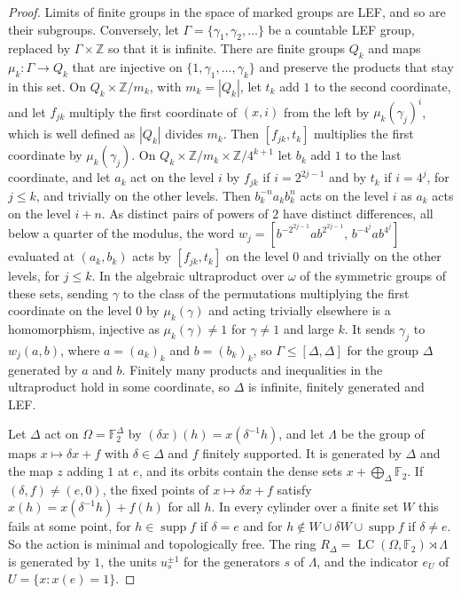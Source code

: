 \documentclass[11pt]{amsart}
\newcommand{\F}{\mathbb F}
\newcommand{\Z}{\mathbb Z}
\newcommand{\LC}{\operatorname{LC}}
\begin{document}
\begin{proof}
Limits of finite groups in the space of marked groups are LEF, and so are
their subgroups. Conversely, let $\Gamma=\{\gamma_1,\gamma_2,\dots\}$ be a
countable LEF group, replaced by $\Gamma\times\Z$ so that it is infinite.
There are finite groups $Q_k$ and maps $\mu_k\colon\Gamma\to Q_k$ that are
injective on $\{1,\gamma_1,\dots,\gamma_k\}$ and preserve the products
that stay in this set. On $Q_k\times\Z/m_k$, with $m_k=|Q_k|$, let $t_k$
add $1$ to the second coordinate, and let $f_{jk}$ multiply the first
coordinate of $(x,i)$ from the left by $\mu_k(\gamma_j)^i$, which is well
defined as $|Q_k|$ divides $m_k$. Then $[f_{jk},t_k]$ multiplies the first
coordinate by $\mu_k(\gamma_j)$. On $Q_k\times\Z/m_k\times\Z/4^{k+1}$ let
$b_k$ add $1$ to the last coordinate, and let $a_k$ act on the level $i$
by $f_{jk}$ if $i=2^{2j-1}$ and by $t_k$ if $i=4^j$, for $j\le k$, and
trivially on the other levels. Then $b_k^{-n}a_kb_k^n$ acts on the level
$i$ as $a_k$ acts on the level $i+n$. As distinct pairs of powers of $2$
have distinct differences, all below a quarter of the modulus, the word
$w_j=[b^{-2^{2j-1}}ab^{2^{2j-1}},\,b^{-4^j}ab^{4^j}]$ evaluated at
$(a_k,b_k)$ acts by $[f_{jk},t_k]$ on the level $0$ and trivially on the
other levels, for $j\le k$. In the algebraic ultraproduct over $\omega$ of
the symmetric groups of these sets, sending $\gamma$ to the class of the
permutations multiplying the first coordinate on the level $0$ by
$\mu_k(\gamma)$ and acting trivially elsewhere is a homomorphism,
injective as $\mu_k(\gamma)\ne1$ for $\gamma\ne1$ and large $k$. It sends
$\gamma_j$ to $w_j(a,b)$, where $a=(a_k)_k$ and $b=(b_k)_k$, so
$\Gamma\le[\Delta,\Delta]$ for the group $\Delta$ generated by $a$ and $b$.
Finitely many products and inequalities in the ultraproduct hold in some
coordinate, so $\Delta$ is infinite, finitely generated and LEF.

Let $\Delta$ act on $\Omega=\F_2^{\Delta}$ by $(\delta x)(h)=x(\delta^{-1}h)$,
and let $\Lambda$ be the group of maps $x\mapsto\delta x+f$ with
$\delta\in\Delta$ and $f$ finitely supported. It is generated by $\Delta$
and the map $z$ adding $1$ at $e$, and its orbits contain the dense sets
$x+\bigoplus_\Delta\F_2$. If $(\delta,f)\ne(e,0)$, the fixed points of
$x\mapsto\delta x+f$ satisfy $x(h)=x(\delta^{-1}h)+f(h)$ for all $h$. In
every cylinder over a finite set $W$ this fails at some point, for
$h\in\operatorname{supp}f$ if $\delta=e$ and for
$h\notin W\cup\delta W\cup\operatorname{supp}f$ if $\delta\ne e$. So the
action is minimal and topologically free. The ring
$R_\Delta=\LC(\Omega,\F_2)\rtimes\Lambda$ is generated by $1$, the units
$u_s^{\pm1}$ for the generators $s$ of $\Lambda$, and the indicator $e_U$
of $U=\{x:x(e)=1\}$.


\end{proof}
\end{document}
